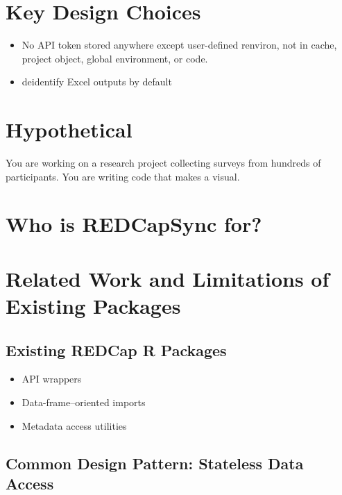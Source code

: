 \section{Key Design Choices}\label{key-design-choices}

\begin{itemize}
\tightlist
\item
  No API token stored anywhere except user-defined renviron, not in cache, project object, global environment, or code.
\item
  deidentify Excel outputs by default
\end{itemize}

\section{Hypothetical}\label{hypothetical}

You are working on a research project collecting surveys from hundreds of participants. You are writing code that makes a visual.

\section{Who is REDCapSync for?}\label{who-is-redcapsync-for}

\section{Related Work and Limitations of Existing Packages}\label{related-work-and-limitations-of-existing-packages}

\subsection{Existing REDCap R Packages}\label{existing-redcap-r-packages}

\begin{itemize}
\tightlist
\item
  API wrappers\\
\item
  Data-frame--oriented imports\\
\item
  Metadata access utilities
\end{itemize}

\subsection{Common Design Pattern: Stateless Data Access}\label{common-design-pattern-stateless-data-access}


